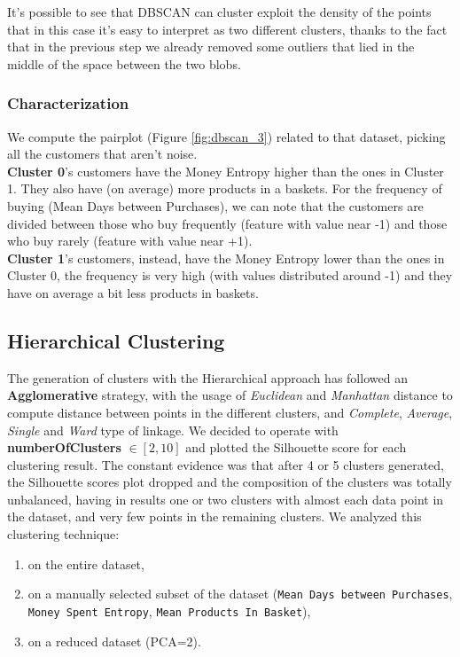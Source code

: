 \documentclass[12pt]{article}
\begin{document}
It's possible to see that DBSCAN can cluster exploit the density of the points that in this case it's easy to interpret as two different clusters, thanks to the fact that in the previous step we already removed some outliers that lied in the middle of the space between the two blobs.

\subsubsection{Characterization}  
We compute the pairplot (Figure \ref{fig:dbscan_3}) related to that dataset, picking all the customers that aren't noise.\\ \textbf{Cluster 0}'s customers have the Money Entropy higher than the ones in Cluster 1. They also have (on average) more products in a baskets. For the frequency of buying (Mean Days between Purchases), we can note that the customers are divided between those who buy frequently (feature with value near -1) and those who buy rarely (feature with value near +1).\\ \textbf{Cluster 1}'s customers, instead, have the Money Entropy lower than the ones in Cluster 0, the frequency is very high (with values distributed around -1) and they have on average a bit less products in baskets.


\subsection{Hierarchical Clustering}
The generation of clusters with the Hierarchical approach has followed an \textbf{Agglomerative} strategy, with the usage of \textit{Euclidean} and \textit{Manhattan} distance to compute distance between points in the different clusters, and \textit{Complete}, \textit{Average}, \textit{Single} and \textit{Ward} type of linkage. We decided to operate with \textbf{numberOfClusters} $\in [2,10]$
and plotted the Silhouette score for each clustering result. The constant evidence was that after 4 or 5 clusters generated, the Silhouette scores plot dropped and the composition of the clusters was totally unbalanced, having in results one or two clusters with almost each data point in the dataset, and very few points in the remaining clusters.
We analyzed this clustering technique:
\begin{enumerate}
    \item on the entire dataset,
    \item on a manually selected subset of the dataset (\texttt{Mean Days between Purchases}, \texttt{Money Spent Entropy}, \texttt{Mean Products In Basket}),
    \item on a reduced dataset (PCA=2).
\end{enumerate}
\end{document}
